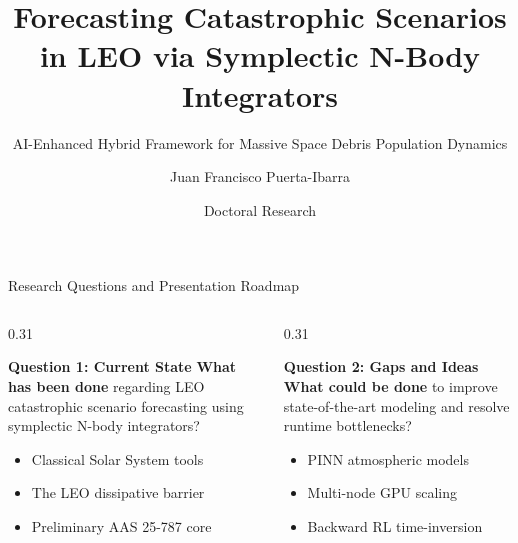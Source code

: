 \documentclass[aspectratio=169,10pt]{beamer}
\title[PhD Research Proposal]{Forecasting Catastrophic Scenarios in LEO via Symplectic N-Body Integrators}
\subtitle{AI-Enhanced Hybrid Framework for Massive Space Debris Population Dynamics}
\author[J. F. Puerta-Ibarra]{Juan Francisco Puerta-Ibarra}
\institute[PhD in Engineering]{Faculty of Engineering \\ Universidad de Antioquia}
\date[Doctoral Research]{Doctoral Research}
\begin{document}
\begin{frame}[plain]
    \titlepage
\end{frame}

\begin{frame}{Research Questions and Presentation Roadmap}
    \begin{columns}[t]
        \begin{column}{0.31\textwidth}
            \begin{block}{\textbf{Question 1: Current State}}
                \small
                \textbf{What has been done} regarding LEO catastrophic scenario forecasting using symplectic N-body integrators?
                \begin{itemize}
                    \setlength{\itemsep}{2pt}
                    \item Classical Solar System tools
                    \item The LEO dissipative barrier
                    \item Preliminary AAS 25-787 core
                \end{itemize}
            \end{block}
        \end{column}
        
        \begin{column}{0.31\textwidth}
            \begin{exampleblock}{\textbf{Question 2: Gaps and Ideas}}
                \small
                \textbf{What could be done} to improve state-of-the-art modeling and resolve runtime bottlenecks?
                \begin{itemize}
                    \setlength{\itemsep}{2pt}
                    \item PINN atmospheric models
                    \item Multi-node GPU scaling
                    \item Backward RL time-inversion
                \end{itemize}
            \end{exampleblock}
        \end{column}
        

\end{columns}
\end{frame}
\end{document}
